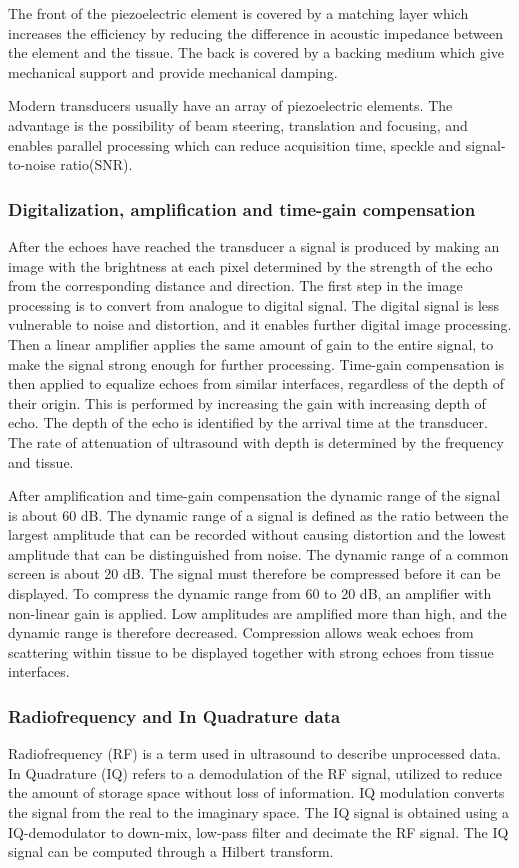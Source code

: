 The front of the piezoelectric element is covered by a matching layer which increases the efficiency by reducing the difference in acoustic impedance between the element and the tissue. The back is covered by a backing medium which give mechanical support and provide mechanical damping. 

Modern transducers usually have an array of piezoelectric elements. The advantage is the possibility of beam steering, translation and focusing, and enables parallel processing which can reduce acquisition time, speckle and signal-to-noise ratio(SNR)\cite{Flower2012}.
   
\subsubsection{Digitalization, amplification and time-gain compensation}
After the echoes have reached the transducer a signal is produced by making an image with the brightness at each pixel determined by the strength of the echo from the corresponding distance and direction. The first step in the image processing is to convert from analogue to digital signal. The digital signal is less vulnerable to noise and distortion, and it enables further digital image processing. Then a linear amplifier applies the same amount of gain to the entire signal, to make the signal strong enough for further processing. Time-gain compensation is then applied to equalize echoes from similar interfaces, regardless of the depth of their origin. This is performed by increasing the gain with increasing depth of echo. The depth of the echo is identified by the arrival time at the transducer. The rate of attenuation of ultrasound with depth is determined by the frequency and tissue.

After amplification and time-gain compensation the dynamic range of the signal is about 60 dB. The dynamic range of a signal is defined as the ratio between the largest amplitude that can be recorded without causing distortion and the lowest amplitude that can be distinguished from noise. The dynamic range of a common screen is about 20 dB. The signal must therefore be compressed before it can be displayed. To compress the dynamic range from 60 to 20 dB, an amplifier with non-linear gain is applied. Low amplitudes are amplified more than high, and the dynamic range is therefore decreased. Compression allows weak echoes from scattering within tissue to be displayed together with strong echoes from tissue interfaces.

\subsubsection{Radiofrequency and In Quadrature data}
Radiofrequency (RF) is a term used in ultrasound to describe unprocessed data. In Quadrature (IQ) refers to a demodulation of the RF signal, utilized to reduce the amount of storage space without loss of information. IQ modulation converts the signal from the real to the imaginary space. The IQ signal is obtained using a IQ-demodulator to down-mix, low-pass filter and decimate the RF signal. The IQ signal can be computed through a Hilbert transform\cite{Kirkhorn1999}.

